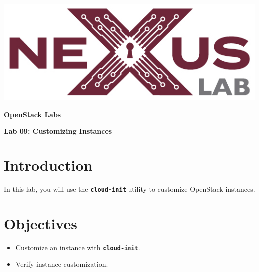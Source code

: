 \documentclass[letterpaper, 12pt]{article}
\begin{document}
\begin{titlepage}
    \centering
    \includegraphics[scale=0.5]{images/nexus_lab_logo.png}

    \vspace*{\baselineskip}

    \textbf{\Large OpenStack Labs}

    \vspace*{\baselineskip}

    \textbf{\Large Lab 09: Customizing Instances}
    \vspace*{\fill}
\end{titlepage}

{
    \fancyhf{}
    \fancyfoot[R]{\footnotesize\thepage}
    \renewcommand{\headrulewidth}{0pt}
}

\pagestyle{fancy}
\tableofcontents
\clearpage

\section*{Introduction}
\label{sec:introduction}
In this lab, you will use the \textbf{\texttt{cloud-init}} utility to customize OpenStack instances.

\section*{Objectives}
\label{sec:objectives}
\begin{itemize}[itemsep=0pt]
    \item Customize an instance with \textbf{\texttt{cloud-init}}.
    \item Verify instance customization.
\end{itemize}
\clearpage
\end{document}
